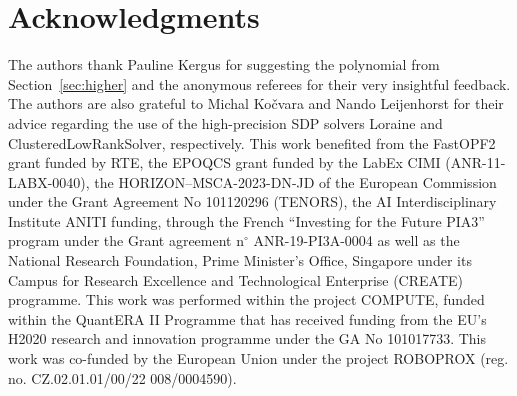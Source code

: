\documentclass[a4paper,12pt]{article}
\begin{document}
\section*{Acknowledgments}
The authors thank Pauline Kergus for suggesting the polynomial from  Section~\ref{sec:higher} {and the anonymous referees for their very insightful feedback. 
The authors are also grateful to Michal Ko{\v c}vara and Nando Leijenhorst for their advice regarding the use of the high-precision SDP solvers Loraine and ClusteredLowRankSolver,  respectively.
}
This work benefited from the FastOPF2 grant funded by RTE, the EPOQCS grant funded by the LabEx CIMI (ANR-11-LABX-0040), the HORIZON–MSCA-2023-DN-JD of the European Commission under the Grant Agreement No 101120296 (TENORS), the AI Interdisciplinary Institute ANITI funding, through the French ``Investing for the Future PIA3'' program under the Grant agreement n${}^\circ$ ANR-19-PI3A-0004 as well as the National Research Foundation, Prime Minister’s Office, Singapore under its Campus for Research Excellence and Technological Enterprise (CREATE) programme.
This work was performed within the project
COMPUTE, funded within the QuantERA II Programme that has received funding from the EU’s H2020 research and innovation programme under the GA No 101017733. 
This work was co-funded by the European Union under the project ROBOPROX (reg. no. CZ.02.01.01/00/22 008/0004590). 

%

\end{document}
